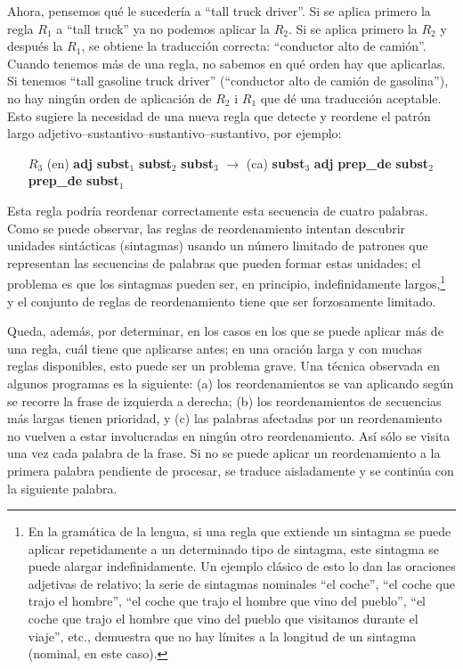 Ahora, pensemos qué le sucedería a ``tall truck driver''. Si se aplica primero la regla $R_1$ a ``tall truck'' ya no podemos aplicar la $R_2$. Si se aplica primero la $R_2$ y después la $R_1$, se obtiene la traducción correcta: ``conductor alto de camión''. Cuando tenemos más de una regla, no sabemos en qué orden hay que aplicarlas. Si tenemos ``tall gasoline truck driver'' (``conductor alto de camión de gasolina''), no hay ningún orden de aplicación de $R_2$ i $R_1$ que dé una traducción aceptable. Esto sugiere la necesidad de una nueva regla que detecte y reordene el patrón largo adjetivo--sustantivo--sustantivo--sustantivo, por ejemplo: \begin{itemize} \item[$R_3$] (en) \textbf{adj} \textbf{subst}$_1$ \textbf{subst}$_2$ \textbf{subst}$_3$ $\rightarrow$ (ca) \textbf{subst}$_3$ \textbf{adj} \textbf{prep\_de} \textbf{subst}$_2$ \textbf{prep\_de} \textbf{subst}$_1$ \end{itemize} Esta regla podría reordenar correctamente esta secuencia de cuatro palabras. Como se puede observar, las reglas de reordenamiento intentan descubrir unidades sintácticas (sintagmas) usando un número limitado de patrones que representan las secuencias de palabras que pueden formar estas unidades; el problema es que los sintagmas pueden ser, en principio, indefinidamente largos,\footnote{En la gramática de la lengua, si una regla que extiende un sintagma se puede aplicar repetidamente a un determinado tipo de sintagma, este sintagma se puede alargar indefinidamente. Un ejemplo clásico de esto lo dan las oraciones adjetivas de relativo; la serie de sintagmas nominales ``el coche'', ``el coche que trajo el hombre'', ``el coche que trajo el hombre que vino del pueblo'', ``el coche que trajo el hombre que vino del pueblo que visitamos durante el viaje'', etc., demuestra que no hay límites a la longitud de un sintagma (nominal, en este caso).} y el conjunto de reglas de reordenamiento tiene que ser forzosamente limitado. 

Queda, además, por determinar, en los casos en los que se puede aplicar más de una regla, cuál tiene que aplicarse antes; en una oración larga y con muchas reglas disponibles, esto puede ser un problema grave. Una técnica observada en algunos programas es la siguiente: (a) los reordenamientos se van aplicando según se recorre la frase de izquierda a derecha; (b) los reordenamientos de secuencias más largas tienen prioridad, y (c) las palabras afectadas por un reordenamiento no vuelven a estar involucradas en ningún otro reordenamiento. Así sólo se visita una vez cada palabra de la frase. Si no se puede aplicar un reordenamiento a la primera palabra pendiente de procesar, se traduce aisladamente y se continúa con la siguiente palabra. 

